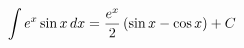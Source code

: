 \documentclass[preview]{standalone}
\begin{document}
\begin{align*}
\special{dvisvgm:raw <g id='unique000'>}\int e^x \sin x \, dx = \frac{e^x}{2}\left( \sin x - \cos x \right) + C\special{dvisvgm:raw </g>}
\end{align*}
\end{document}
